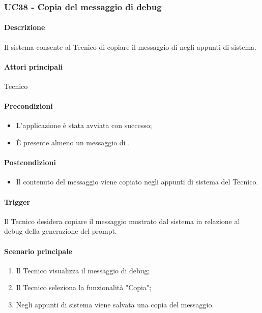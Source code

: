 \subsubsection{UC38 - Copia del messaggio di debug}\label{UC38}
\paragraph*{Descrizione}
Il sistema consente al Tecnico di copiare il messaggio di  negli appunti di sistema.

\paragraph*{Attori principali}
Tecnico

\paragraph*{Precondizioni}
\begin{itemize}
  \item L'applicazione è stata avviata con successo;
  \item È presente almeno un messaggio di .  
\end{itemize}

\paragraph*{Postcondizioni}
\begin{itemize}
  \item Il contenuto del messaggio viene copiato negli appunti di sistema del Tecnico.
\end{itemize}

\paragraph*{Trigger}
Il Tecnico desidera copiare il messaggio mostrato dal sistema in relazione al debug della generazione del prompt.

\paragraph*{Scenario principale}
\begin{enumerate}
  \item Il Tecnico visualizza il messaggio di debug;
  \item Il Tecnico seleziona la funzionalità "Copia";
  \item Negli appunti di sistema viene salvata una copia del messaggio.
\end{enumerate}